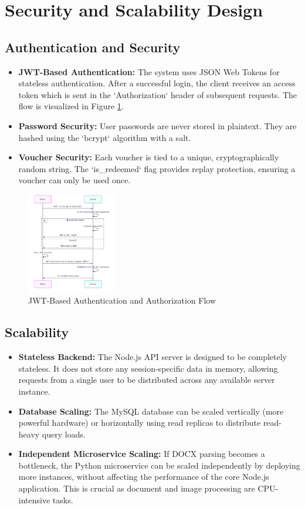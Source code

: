 \section{Security and Scalability Design}
\label{sec:arch-security-scalability}

\subsection{Authentication and Security}
\begin{itemize}
    \item \textbf{JWT-Based Authentication:} The system uses JSON Web Tokens for stateless authentication. After a successful login, the client receives an access token which is sent in the `Authorization` header of subsequent requests. The flow is visualized in Figure \ref{fig:jwt-flow}.
    \item \textbf{Password Security:} User passwords are never stored in plaintext. They are hashed using the `bcrypt` algorithm with a salt.
    \item \textbf{Voucher Security:} Each voucher is tied to a unique, cryptographically random string. The `is_redeemed` flag provides replay protection, ensuring a voucher can only be used once.
\end{itemize}

\begin{figure}[htbp]
\centering
\includegraphics[width=0.35\textwidth]{figures/jwt-flow.png}
\caption{JWT-Based Authentication and Authorization Flow}
\label{fig:jwt-flow}
\end{figure}

\FloatBarrier
\subsection{Scalability}
\begin{itemize}
    \item \textbf{Stateless Backend:} The Node.js API server is designed to be completely stateless. It does not store any session-specific data in memory, allowing requests from a single user to be distributed across any available server instance.
    \item \textbf{Database Scaling:} The MySQL database can be scaled vertically (more powerful hardware) or horizontally using read replicas to distribute read-heavy query loads.
    \item \textbf{Independent Microservice Scaling:} If DOCX parsing becomes a bottleneck, the Python microservice can be scaled independently by deploying more instances, without affecting the performance of the core Node.js application. This is crucial as document and image processing are CPU-intensive tasks.
\end{itemize}